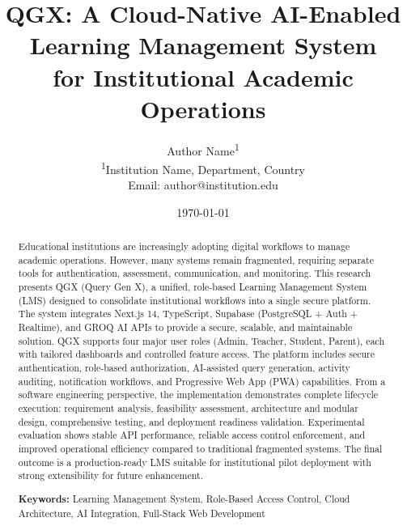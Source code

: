 \documentclass[11pt,a4paper]{article}
\begin{document}

\title{\textbf{QGX: A Cloud-Native AI-Enabled Learning Management System\\for Institutional Academic Operations}}

\author{
    \large Author Name\textsuperscript{1}\\
    \small\textsuperscript{1}Institution Name, Department, Country\\
    \small Email: author@institution.edu\\
    \normalsize
}

\date{\today}

\maketitle


\begin{abstract}

Educational institutions are increasingly adopting digital workflows to manage academic operations. However, many systems remain fragmented, requiring separate tools for authentication, assessment, communication, and monitoring. This research presents QGX (Query Gen X), a unified, role-based Learning Management System (LMS) designed to consolidate institutional workflows into a single secure platform. The system integrates Next.js 14, TypeScript, Supabase (PostgreSQL + Auth + Realtime), and GROQ AI APIs to provide a secure, scalable, and maintainable solution. QGX supports four major user roles (Admin, Teacher, Student, Parent), each with tailored dashboards and controlled feature access. The platform includes secure authentication, role-based authorization, AI-assisted query generation, activity auditing, notification workflows, and Progressive Web App (PWA) capabilities. From a software engineering perspective, the implementation demonstrates complete lifecycle execution: requirement analysis, feasibility assessment, architecture and modular design, comprehensive testing, and deployment readiness validation. Experimental evaluation shows stable API performance, reliable access control enforcement, and improved operational efficiency compared to traditional fragmented systems. The final outcome is a production-ready LMS suitable for institutional pilot deployment with strong extensibility for future enhancement.

\begin{flushleft}
\textbf{Keywords:} Learning Management System, Role-Based Access Control, Cloud Architecture, AI Integration, Full-Stack Web Development
\end{flushleft}

\end{abstract}
\end{document}
